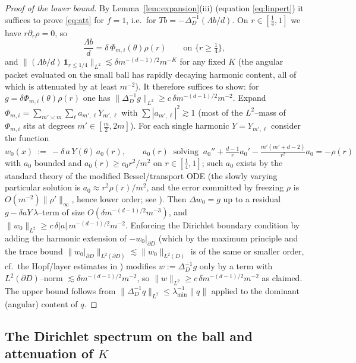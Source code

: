 \documentclass[11pt]{article}
\newcommand{\1}{\mathbf{1}}
\newcommand{\norm}[1]{\lVert #1\rVert}
\begin{document}
\begin{proof}[Proof of the lower bound]
By Lemma~\ref{lem:expansion}(iii) (equation \eqref{eq:linpert}) it suffices to prove
\eqref{eq:att} for $f=1$, i.e.\ for $Tb=-\Delta_D^{-1}(\Lambda b/d)$. On
$r\in[\tfrac14,1]$ we have $r\partial_r\rho=0$, so
\[
\frac{\Lambda b}{d}=\delta\,\Phi_{m,i}(\theta)\rho(r)\qquad\text{on } \{r\ge\tfrac14\},
\]
and $\norm{(\Lambda b/d)\,\mathbf 1_{r\le 1/4}}_{L^2}\lesssim\delta m^{-(d-1)/2}m^{-K}$
for any fixed $K$ (the angular packet evaluated on the small ball has rapidly decaying
harmonic content, all of which is attenuated by at least $m^{-2}$).
It therefore suffices to show: for $g=\delta\Phi_{m,i}(\theta)\rho(r)$ one has
$\norm{\Delta_D^{-1}g}_{L^2}\ge c\,\delta m^{-(d-1)/2}m^{-2}$. Expand
$\Phi_{m,i}=\sum_{m'\asymp m}\sum_{\ell}a_{m',\ell}Y_{m',\ell}$ with
$\sum |a_{m',\ell}|^2\gtrsim 1$ (most of the $L^2$--mass of $\Phi_{m,i}$ sits at degrees
$m'\in[\tfrac m2,2m]$). For each single harmonic $Y=Y_{m',\ell}$ consider the function
\[
w_0(x)\ :=\ -\delta\,a\,Y(\theta)\,a_0(r),\qquad
a_0(r)\ \text{ solving }\ a_0''+\tfrac{d-1}{r}a_0'-\tfrac{m'(m'+d-2)}{r^2}a_0=-\rho(r)
\]
with $a_0$ bounded and $a_0(r)\ge c_0 r^2/m^2$ on $r\in[\tfrac14,1]$; such
$a_0$ exists by the standard theory of the modified Bessel/transport ODE
(the slowly varying particular solution is $a_0\approx r^2\rho(r)/m^2$, and the error
committed by freezing $\rho$ is $O(m^{-2})\|\rho'\|_\infty$, hence lower order;
see \cite[Ch.~III]{Watson}). Then $\Delta w_0=g$ up to a residual
$g-\delta a Y\,\lambda$--term of size $O(\delta m^{-(d-1)/2}m^{-3})$, and
$\norm{w_0}_{L^2}\ge c\,\delta|a|\,m^{-(d-1)/2}m^{-2}$. Enforcing the Dirichlet
boundary condition by adding the harmonic extension of $-w_0|_{\partial D}$
(which by the maximum principle and the trace bound
$\norm{w_0|_{\partial D}}_{L^2(\partial D)}\lesssim\norm{w_0}_{L^2(D)}$
is of the same or smaller order, cf.\ the Hopf/layer estimates in \cite{GT})
modifies $w:=\Delta_D^{-1}g$ only by a term with
$L^2(\partial D)$--norm $\lesssim\delta m^{-(d-1)/2}m^{-2}$, so
$\norm{w}_{L^2}\ge c\,\delta m^{-(d-1)/2}m^{-2}$ as claimed. The upper bound follows
from $\norm{\Delta_D^{-1}q}_{L^2}\le \lambda_{\min}^{-1}\norm q$ applied to the
dominant (angular) content of $q$.
\end{proof}

\subsection{The Dirichlet spectrum on the ball and attenuation of $K$}
\end{document}

